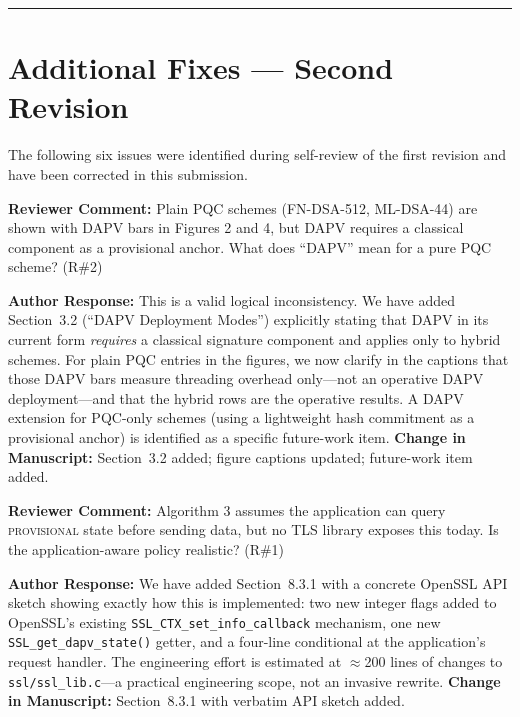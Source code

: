 \documentclass[12pt]{article}
\newcommand{\RC}[1]{\textcolor{reviewerblue}{\textbf{Reviewer Comment:}} #1}
\newcommand{\AR}[1]{\textcolor{replygreen}{\textbf{Author Response:}} #1}
\newcommand{\CH}[1]{\textcolor{changemagenta}{\textbf{Change in Manuscript:}} #1}
\begin{document}
\vspace{1em}
\hrule
\vspace{1em}

\section*{Additional Fixes --- Second Revision}

The following six issues were identified during self-review of the first
revision and have been corrected in this submission.

\begin{reviewbox}
\RC{Plain PQC schemes (FN-DSA-512, ML-DSA-44) are shown with DAPV bars in
Figures 2 and 4, but DAPV requires a classical component as a provisional
anchor. What does ``DAPV'' mean for a pure PQC scheme? (R\#2)}
\end{reviewbox}
\begin{replybox}
\AR{This is a valid logical inconsistency. We have added Section~3.2
(``DAPV Deployment Modes'') explicitly stating that DAPV in its current form
\emph{requires} a classical signature component and applies only to hybrid
schemes. For plain PQC entries in the figures, we now clarify in the captions
that those DAPV bars measure threading overhead only---not an operative DAPV
deployment---and that the hybrid rows are the operative results. A DAPV
extension for PQC-only schemes (using a lightweight hash commitment as a
provisional anchor) is identified as a specific future-work item.}
\CH{Section~3.2 added; figure captions updated; future-work item added.}
\end{replybox}

\begin{reviewbox}
\RC{Algorithm 3 assumes the application can query \textsc{provisional} state
before sending data, but no TLS library exposes this today. Is the
application-aware policy realistic? (R\#1)}
\end{reviewbox}
\begin{replybox}
\AR{We have added Section~8.3.1 with a concrete OpenSSL API sketch showing
exactly how this is implemented: two new integer flags added to OpenSSL's
existing \texttt{SSL\_CTX\_set\_info\_callback} mechanism, one new
\texttt{SSL\_get\_dapv\_state()} getter, and a four-line conditional at the
application's request handler. The engineering effort is estimated at
$\approx$200 lines of changes to \texttt{ssl/ssl\_lib.c}---a practical
engineering scope, not an invasive rewrite.}
\CH{Section~8.3.1 with verbatim API sketch added.}
\end{replybox}
\end{document}

